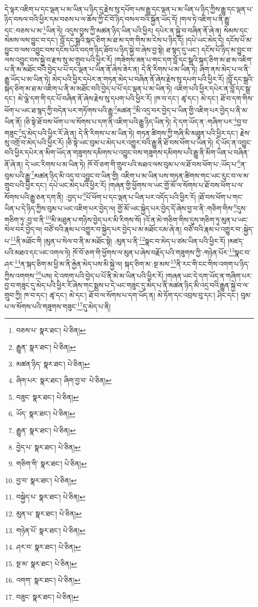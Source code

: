 དེ་ལྟར་འཇིག་པ་དང་ལྡན་པ་མ་ཡིན་པ་ཉིད་དུ་རྗེས་སུ་དཔོག་པས་རྒྱུ་དང་ལྡན་པ་མ་ཡིན་པ་ཉིད་ཀྱིས་རྒྱུ་དང་ལྡན་པ་ཉིད་བསལ་བའི་ཕྱིར་དམ་བཅས་པ་ལ་ཆོས་ཀྱི་ངོ་བོ་ཉིད་བསལ་བའི་སྐྱོན་ཡོད་དོ། །གལ་ཏེ་འཇིག་པ་ནི་རྒྱུ་དང་:བཅས་པ་མ་\footnote{བཅས་པ་  སྣར་ཐང་།  པེ་ཅིན། }ཡིན་ཏེ། འདུས་བྱས་ཀྱི་མཚན་ཉིད་ཡིན་པའི་ཕྱིར། དཔེར་ན་སྐྱེ་བ་བཞིན་ནོ་ཞེ་ན། སེམས་དང་སེམས་ལས་བྱུང་བ་དང་། བློ་དང་སྒྲའི་སྐད་ཅིག་མ་ཐ་མ་དག་གིས་མ་ངེས་པ་ཉིད་དོ། །དཔེ་ཡང་མེད་དེ། དངོས་པོ་མ་བྱུང་བ་ལས་འབྱུང་བས་དངོས་པོའི་བདག་ཉིད་ཐོབ་པ་ཉིད་སྐྱེ་བ་ཞེས་བྱ་སྟེ། ཐ་སྙད་དུ་ཡང་། དངོས་པོ་ཉིད་མ་བྱུང་བ་ལས་འབྱུང་བས་སྐྱེ་བ་རྫས་སུ་མ་གྲུབ་པའི་ཕྱིར་རོ། །གཟེགས་ཟན་པ་གང་དག་བློ་དང་སྒྲའི་སྐད་ཅིག་མ་ཐ་མ་འཇིག་པ་ནི་མ་མཐོང་བའི་བྱེད་པ་པོ་དང་ལྡན་པ་ཡིན་ནོ་ཞེས་ཟེར་ན། དེ་ནི་རིགས་པ་མ་ཡིན་ཏེ། ཞིག་ནས་མེད་པ་ལ་ནི་རྒྱུ་ཡོད་པ་མ་ཡིན་ཏེ། མེད་པའི་ཕྱིར་དཔེར་ན་གཏན་མེད་པ་བཞིན་ནོ་ཞེས་རྗེས་སུ་དཔག་པའི་ཕྱིར་རོ། །བློ་དང་སྒྲའི་སྐད་ཅིག་མ་ཐ་མ་འཇིག་པ་ནི་མ་མཐོང་བའི་བྱེད་པ་པོ་དང་ལྡན་པ་མ་ཡིན་ཏེ། འཇིག་པའི་ཕྱིར་དཔེར་ན་བློ་དང་སྒྲ་དང་། མེ་ལྕེ་དག་གི་དང་པོ་བཞིན་ནོ་ཞེས་རྗེས་སུ་དཔག་པའི་ཕྱིར་རོ། །ཁ་བ་དང་། ཚྭ་དང་། མེ་དང་། ཐོ་བ་དག་གིས་ཕོག་པ་ཡང་ཐ་སྙད་ཀྱི་བདེན་པར་གཏོགས་པའི་རྒྱུ་\footnote{རྒྱུན་  སྣར་ཐང་།  པེ་ཅིན། }མཚན་\footnote{མཚན་ཉིད་  སྣར་ཐང་།  པེ་ཅིན། }མི་འདྲ་བར་བྱེད་པ་ཡིན་གྱི་འཇིག་པར་བྱེད་པ་ནི་མ་ཡིན་ནོ། །ཅི་སྟེ་ཐོ་བས་ཕོག་པ་ལ་སོགས་པ་དག་ནི་འཇིག་པའི་རྒྱུ་ཉིད་ཡིན་ཏེ། དེ་དག་ཡོད་ན་:གཞིག་པར་\footnote{ཞིག་པར་  སྣར་ཐང་། ཞིག་བྱ་བ་  པེ་ཅིན། }བྱ་བ་གཟུང་\footnote{བཟུང་  སྣར་ཐང་།  པེ་ཅིན། }དུ་མེད་པའི་ཕྱིར་རོ་ཞེ་ན། དེ་ནི་རིགས་པ་མ་ཡིན་ཏེ། གཏན་ཚིགས་ཀྱི་གཞི་མི་མཐུན་པའི་ཕྱིར་དང་། རྗེས་སུ་འགྲོ་བ་མེད་པའི་ཕྱིར་རོ། །ཅི་སྟེ་ཡང་བུམ་པ་མེད་པར་འགྱུར་བའི་རྒྱུ་ནི་ཐོ་བས་ཕོག་པ་ཡིན་ཏེ། དེ་ཡོད་ན་འབྱུང་བའི་ཕྱིར་དཔེར་ན་མིག་ཡོད་ན་གཟུགས་དམིགས་པ་འབྱུང་བས་གཟུགས་དམིགས་པའི་རྒྱུ་ནི་མིག་ཡིན་པ་བཞིན་ནོ་ཞེ་ན། དེ་ཡང་རིགས་པ་མ་ཡིན་ཏེ། ཁོ་བོ་ཅག་གི་གྲུབ་པའི་མཐའ་ལས་བུམ་པ་ལ་ཐོ་བས་ཕོག་པ་:ཡོད་པ་\footnote{ཡོད་  སྣར་ཐང་།  པེ་ཅིན། }ན་བུམ་པའི་རྒྱུ་\footnote{རྒྱུན་  སྣར་ཐང་།  པེ་ཅིན། }མཚན་ཉིད་མི་འདྲ་བ་འབྱུང་བ་ཡིན་གྱི། འཇིག་པ་མ་ཡིན་པས་གཏན་ཚིགས་གང་ཡང་རུང་བ་ལ་མ་གྲུབ་པའི་ཕྱིར་དང་། དཔེ་ཡང་མེད་པའི་ཕྱིར་རོ། །གཞན་གྱི་ཕྱོགས་ལ་ཡང་གྱོ་མོ་ལ་སོགས་པ་ཐོ་བས་ཕོག་པ་ལ་སོགས་པའི་རྒྱུ་ཅན་དག་ནི། :བྱད་པ་\footnote{བྱེད་པ་  སྣར་ཐང་།  པེ་ཅིན། }པོ་ཕོག་པ་དང་ལྡན་པ་ཡིན་པར་འདོད་པའི་ཕྱིར་རོ། །ཐོ་བས་ཕོག་པ་གང་ཡིན་པ་དེ་ཉིད་ཀྱིས་བུམ་པ་ཡང་འཇིག་པར་བྱེད་ལ། གྱོ་མོ་ཡང་སྐྱེད་པར་བྱེད་དོ་ཞེས་བྱ་བ་ནི་:གཅིག་གིས་\footnote{གཅིག་གི་  སྣར་ཐང་།  པེ་ཅིན། }དུས་གཅིག་ཏུ་:བྱ་བ་ནི་\footnote{བྱ་བ་  སྣར་ཐང་།  པེ་ཅིན། }མི་མཐུན་པ་གཉིས་བྱེད་པར་མི་རིགས་སོ། །འོ་ན་མེ་གཅིག་གིས་དུས་གཅིག་ཏུ་མུན་པ་ཡང་སེལ་བར་བྱེད་ལ། བཙོ་བའི་རྣམ་པ་འགྱུར་བ་སྐྱེད་པར་བྱེད་པ་མ་མཐོང་ངམ་ཞེ་ན། བཙོ་བའི་རྣམ་པ་འགྱུར་བ་:སྐྱེད་པ་\footnote{བསྐྱེད་པ་  སྣར་ཐང་།  པེ་ཅིན། }ནི་མཐོང་གི །མུན་པ་སེལ་བ་ནི་མ་མཐོང་སྟེ། :མུན་པ་ནི་\footnote{མུན་པ་  སྣར་ཐང་།  པེ་ཅིན། }སྣང་བ་མེད་པ་ཙམ་ཡིན་པའི་ཕྱིར་རོ། །མཛད་པའི་མཐའ་དང་ཡང་འགལ་ཏེ། ཁོ་བོ་ཅག་གི་ཕྱོགས་ལ་མུན་པ་ཞེས་བརྗོད་པའི་གཟུགས་ཀྱི་:གཉེན་པོར་\footnote{གཉེན་པོ་  སྣར་ཐང་།  པེ་ཅིན། }སྣང་བ་ཤར་\footnote{ཤར་བ་  སྣར་ཐང་།  པེ་ཅིན། }ན་སྐད་ཅིག་མ་ཕྱི་མ་ནི་རྐྱེན་མེད་པས་མི་སྐྱེ་ལ། སྐད་ཅིག་མ་:སྔ་མས་\footnote{སྔ་མ་  སྣར་ཐང་།  པེ་ཅིན། }ནི་རང་གི་ངང་གིས་འགག་པ་ཉིད་ཀྱིས་འགགས་\footnote{འགག་  སྣར་ཐང་།  པེ་ཅིན། }པས། དེ་འགག་པའི་བྱེད་པ་པོ་ནི་མེ་མ་ཡིན་པའི་ཕྱིར་རོ། །གཞན་ཡང་དེ་དག་ཡོད་ན་གཞིག་པར་བྱ་བ་གཟུང་དུ་མེད་པའི་ཕྱིར་རོ་ཞེས་གང་སྨྲས་པ་དེ་ཡང་གཟུང་དུ་མེད་པ་ནི་མཚན་ཉིད་མི་འདྲ་བའི་རྒྱུན་སྐྱེ་བ་ལ་གྲུབ་ཀྱི། ཁ་བ་དང་། ཚྭ་དང་། མེ་དང་། ཐོ་བ་ལ་སོགས་པ་དག་ཡོད་ན། མེ་ཏོག་དང་འབྲས་བུ་དང་། ཤིང་དང་། བུམ་པ་ལ་སོགས་པའི་གཟུགས་གཟུང་\footnote{བཟུང་  སྣར་ཐང་།  པེ་ཅིན། }དུ་མེད་པ་ནི། 